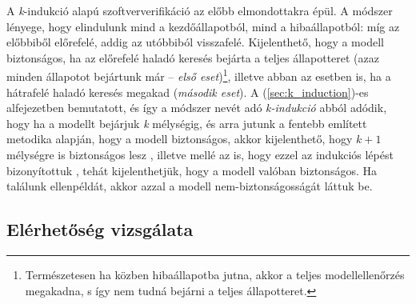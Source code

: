 \newline
\newline
A \emph{k}-indukció alapú szoftververifikáció az előbb elmondottakra épül. A módszer lényege, hogy elindulunk mind a kezdőállapotból, mind a hibaállapotból: míg az előbbiből előrefelé, addig az utóbbiból visszafelé. Kijelenthető, hogy a modell biztonságos, ha az előrefelé haladó keresés bejárta a teljes állapotteret (azaz minden állapotot bejártunk már  -- \emph{első eset})\footnote{Természetesen ha közben hibaállapotba jutna, akkor a teljes modellellenőrzés megakadna, s így nem tudná bejárni a teljes állapotteret.}, illetve abban az esetben is, ha a hátrafelé haladó keresés megakad (\emph{második eset}).
\newline
\newline
A (\ref{sec:k_induction})-es alfejezetben bemutatott, és így a módszer nevét adó \emph{k-indukció} abból adódik, hogy ha a modellt bejárjuk \emph{k} mélységig, és arra jutunk a fentebb említett metodika alapján, hogy a modell biztonságos, akkor kijelenthető, hogy $k+1$ mélységre is biztonságos lesz \cite{donaldson_cikk}, illetve mellé az is, hogy ezzel az indukciós lépést bizonyítottuk \cite{k_induction_article}, tehát kijelenthetjük, hogy a modell valóban biztonságos. Ha találunk ellenpéldát, akkor azzal a modell nem-biztonságosságát láttuk be.

\subsection{Elérhetőség vizsgálata}

